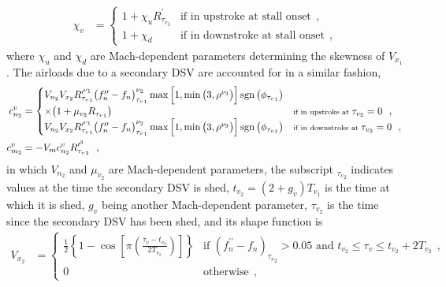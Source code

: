 \documentclass[12pt,a4paper,oneside,english]{abntex2} %
\DeclareMathOperator{\sgn}{sgn}
\def\lb{\left[}
\def\rb{\right]}
\def\lp{\left(}
\def\rp{\right)}
\begin{document}
\begin{align}
    \chi_v &= 
    \begin{cases}
    1 + \chi_u R^{\prime}_{{\tau_v}_1} &\text{if in upstroke at stall onset} \ \ ,
    \\
    1 + \chi_d &\text{if in downstroke at stall onset} \ \ ,
    \end{cases}
    \label{eq:chi_v}
\end{align}
where $\chi_u$ and $\chi_d$ are Mach-dependent parameters determining the skewness of $V_{x_1}$. The airloads due to a secondary DSV are accounted for in a similar fashion, 
\begin{align}
    c_{n_2}^v &= 
    \begin{cases}
    V_{n_2} V_{x_2} R_{{\tau_v}_1}^{\prime^{\nu_1}}  
    \big( f_n^{\prime\prime} - f_n \big)_{{\tau_v}_1}^{\nu_2}  
    \max \Big[ 1, \min \big( 3, \rho^{\nu_3} \big) \Big]\sgn\big( \phi_{{\tau_v}_1} \big)
    \\
    \times\big( 1 + \mu_{v_2} R_{{\tau_v}_1} \big)
    & \text{\scriptsize{if in upstroke at }} \tau_{v_2} = 0 \ \ ,
    \\
    V_{n_2} V_{x_2} R_{{\tau_v}_1}^{\prime^{\nu_1}}  
    \big( f_n^{\prime\prime} - f_n \big)_{{\tau_v}_1}^{\nu_2}  
    \max \Big[ 1, \min \big( 3, \rho^{\nu_3} \big) \Big]  
    \sgn\big( \phi_{{\tau_v}_1} \big) 
    & \text{\scriptsize{if in downstroke at }} \tau_{v_2} = 0 \ \ ,
    \end{cases}
    \label{eq:cnv2} 
    \\
    c_{m_2}^v &= -V_m c_{n_2}^v R^{\prime^3}_{{\tau_v}_2} \ \ ,
    \label{eq:cmv2} 
\end{align}
in which $V_{n_2}$ and $\mu_{v_2}$ are Mach-dependent parameters, the subscript $_{{\tau_v}_2}$ indicates values at the time the secondary DSV is shed, $t_{v_2}=\lp2+g_v\rp T_{v_1}$ is the time at which it is shed, $g_v$ being another Mach-dependent parameter, $\tau_{v_2}$ is the time since the secondary DSV has been shed, and its shape function is
\begin{align}
    V_{x_2} &= 
    \begin{cases}
    \frac{1}{2}\left\{1-\cos{\lb\pi\lp\frac{\tau_v-t_{v_2}}{2T_{v_2}}\rp\rb}\right\}
    &\text{if } \lp f_n^{\prime\prime}-f_n\rp_{{\tau_v}_2} > 0.05 \text{ and } t_{v_2} \leq \tau_v \leq t_{v_2}+2T_{v_2} \ \ ,
    \\ 
    0  &\text{otherwise} \ \ ,
    \end{cases}
    \label{eq:Vx2}
\end{align}
\end{document}
